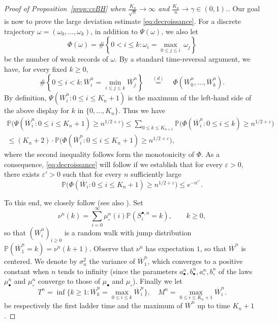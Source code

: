 \documentclass[10pt]{amsart}
\theoremstyle{definition}\newtheorem{defi}[theo]{Definition}\newtheorem{rema}[theo]{Remark}\newtheorem{exam}[theo]{Example}\newtheorem{exem}[theo]{Example}\newtheorem{nota}[theo]{Notation}
\renewcommand{\P}{\mathbb{P}}
\def\eps{\varepsilon}
\def\mub{\mu_{\bullet}}
\def\muc{\mu_{\circ}}
\def\mubn{\mu_{\bullet}^{n}}
\def\mucn{\mu_{\circ}^{n}}
\def\Sbn{S^{\bullet,n}}
\renewcommand{\epsilon}{\varepsilon}
\renewcommand\Pr[1]{\mathbb{P}\left(#1\right)}
\begin{document}
\begin{proof}[Proof of  Proposition~\ref{prop:cvBH}  when $\tfrac{K_{n}}{\sqrt{n}} \rightarrow \infty$ and $ \tfrac{K_{n}}{n}  \rightarrow \gamma \in (0,1)$.]
Our goal is now to prove the large deviation estimate \eqref{eq:decroissance}.
For a discrete trajectory
\hbox{$\omega=(\omega_0,\dots,\omega_{k})$},
in addition to $\Psi(\omega)$, we also let
\[\Phi(\omega)=\# \left\{0 < i \leq k: \omega_{i}=\max_{0 \leq j \leq i} \, \omega_{j} \right \}\]
be the number of weak records of $\omega$.
By a standard time-reversal argument, we have, for every fixed $k \geq 0$,
\[
\# \left\{0 \le i <k:  \overline{W}^{n}_{i}=\min_{i \leq j \leq k}  \overline{W}^{n}_{j} \right\}
\quad \stackrel{(d)}{=} \quad
\Phi(\overline{W}^{n}_0,\dots,\overline{W}^{n}_k).
\]
By definition, $\Psi( \overline{W}^{n}_{i} :0 \leq i \leq K_{n}+1)$ is the maximum
of the left-hand side of the above display for $k$ in $\{0,\dots,K_n\}$.
Thus we have
\begin{multline*}
\P\Big(\Psi( \overline{W}^{n}_{i} :0 \leq i \leq K_{n}+1) \geq n^{1/2+\epsilon}
\Big)  \leq  \sum_{0 \leq k \leq K_{n+1}} \P\Big(\Phi( \overline{W}^{n}_{i} :0 \leq i \leq k) \geq n^{1/2+\epsilon} \Big)\\
 \leq (K_n+2) \cdot \P\Big(\Phi( \overline{W}^{n}_{i} :0 \leq i \leq K_{n}+1) \geq n^{1/2+\epsilon} \Big),
\end{multline*}
where the second inequality follows form the monotonicity of $\Phi$.
As a consequence, \eqref{eq:decroissance} will follow if we establish that
for every $\eps>0$, there exists $\epsilon'>0$ such that for every $n$ sufficiently large
\begin{equation}
  \label{eq:decroissancePhi} \P\big(\Phi( \overline{W}_{i} :0 \leq i \leq K_{n}+1) \geq n^{1/2+\epsilon}
  \big) \leq e^{-n^{\epsilon'}}.
\end{equation}




 To this end, we closely follow \cite{MM03} (see also \cite[Sec.~1.3]{LG05}). Set
\[\nu^{n}(k)=\sum_{ i=0}^{\infty}\mucn(i) \Pr{\Sbn_{i}=k},\qquad k \geq 0,\]
so that  $(\overline{W}^{n}_{i})_{i \geq 0}$ is a random walk  with jump distribution
$\Pr{\overline{W}^{n}_{1}=k}=\nu^{n}(k+1)$.
Observe that $\nu^{n}$ has expectation $1$,
so that $\overline{W}^{n}$ is centered.
We denote by $\sigma_{n}^{2}$  the variance of $\overline{W}^{n}_1$,
which converges to a positive constant when $n$ tends to infinity
(since the parameters $a_\bullet^n,b_\bullet^n,a_\circ^n,b_\circ^n$
of the laws $\mubn$ and $\mucn$ converge to those of $\mub$ and $\muc$).
Finally we let
\[
  T^{n}= \inf \Big\{k \geq 1 : \overline{W}^{n}_{k}= \max_{0 \leq i \leq k} \overline{W}^{n}_{i} \Big\}, \quad M^n = \max_{0 \le i \le {K_n+1}} \overline{W}^{n}_i.
\]
be respectively the first ladder time and the maximum of $\overline{W}^{n}$ up to time $K_{n}+1$.


\end{proof}
\end{document}

